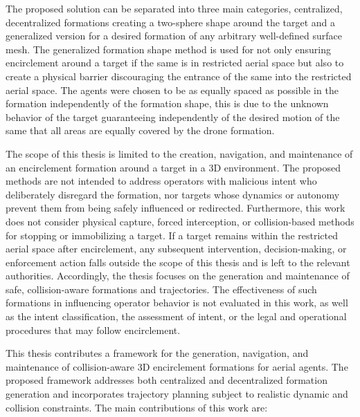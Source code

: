The proposed solution can be separated into three main categories, centralized, decentralized formations creating a two-sphere shape around the target and a generalized version for a desired formation of any arbitrary well-defined surface mesh. The generalized formation shape method is used for not only ensuring encirclement around a target if the same is in restricted aerial space but also to create a physical barrier discouraging the entrance of the same into the restricted aerial space. The agents were chosen to be as equally spaced as possible in the formation independently of the formation shape, this is due to the unknown behavior of the target guaranteeing independently of the desired motion of the same that all areas are equally covered by the drone formation. 

The scope of this thesis is limited to the creation, navigation, and maintenance of an encirclement formation around a target in a \gls{3D} environment. The proposed methods are not intended to address operators with malicious intent who deliberately disregard the formation, nor targets whose dynamics or autonomy prevent them from being safely influenced or redirected. Furthermore, this work does not consider physical capture, forced interception, or collision-based methods for stopping or immobilizing a target. If a target remains within the restricted aerial space after encirclement, any subsequent intervention, decision-making, or enforcement action falls outside the scope of this thesis and is left to the relevant authorities. Accordingly, the thesis focuses on the generation and maintenance of safe, collision-aware formations and trajectories. The effectiveness of such formations in influencing operator behavior is not evaluated in this work, as well as the intent classification, the assessment of intent, or the legal and operational procedures that may follow encirclement.

This thesis contributes a framework for the generation, navigation, and maintenance of collision-aware \gls{3D} encirclement formations for aerial agents. The proposed framework addresses both centralized and decentralized formation generation and incorporates trajectory planning subject to realistic dynamic and collision constraints. The main contributions of this work are:

